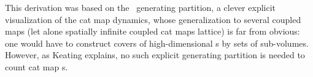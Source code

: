 
This derivation was based on the \AW\ generating partition, a clever
explicit visualization of the cat map dynamics, whose generalization to
several coupled maps (let alone spatially infinite coupled cat
maps lattice) is far from obvious: one would have to construct covers of
high-dimensional {\fundPip}s by sets of sub-volumes.
However, as Keating explains, no such explicit generating
partition is needed to count cat map \po s.
